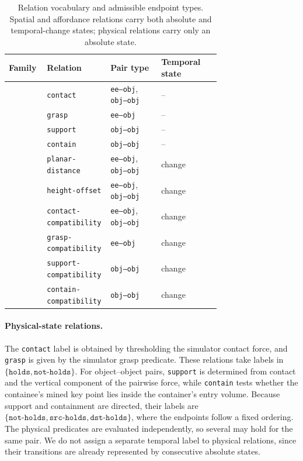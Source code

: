 \begin{table}[h]
\centering
\footnotesize
\setlength{\tabcolsep}{4pt}
\renewcommand{\arraystretch}{1.08}
\caption{Relation vocabulary and admissible endpoint types. Spatial and
affordance relations carry both absolute and temporal-change states; physical
relations carry only an absolute state.}
\label{tab:main_relation_vocab}
\begin{tabularx}{0.99\linewidth}{@{}
>{\raggedright\arraybackslash}p{0.18\linewidth}
>{\raggedright\arraybackslash}p{0.30\linewidth}
>{\raggedright\arraybackslash}p{0.24\linewidth}
>{\raggedright\arraybackslash}X@{}}
\toprule
\textbf{Family} & \textbf{Relation} & \textbf{Pair type} & \textbf{Temporal state} \\
\midrule
\multirow{4}{*}{\textbf{Physical}}
& \texttt{contact} & \texttt{ee--obj}, \texttt{obj--obj} & -- \\
& \texttt{grasp} & \texttt{ee--obj} & -- \\
& \texttt{support} & \texttt{obj--obj} & -- \\
& \texttt{contain} & \texttt{obj--obj} & -- \\
\midrule
\multirow{2}{*}{\textbf{Spatial}}
& \texttt{planar-distance} & \texttt{ee--obj}, \texttt{obj--obj} & change \\
& \texttt{height-offset} & \texttt{ee--obj}, \texttt{obj--obj} & change \\
\midrule
\multirow{4}{*}{\textbf{Affordance}}
& \texttt{contact-compatibility} & \texttt{ee--obj}, \texttt{obj--obj} & change \\
& \texttt{grasp-compatibility} & \texttt{ee--obj} & change \\
& \texttt{support-compatibility} & \texttt{obj--obj} & change \\
& \texttt{contain-compatibility} & \texttt{obj--obj} & change \\
\bottomrule
\end{tabularx}
\end{table}

\paragraph{Physical-state relations.}
The \texttt{contact} label is obtained by thresholding the simulator contact
force, and \texttt{grasp} is given by the simulator grasp predicate. These
relations take labels in \(\{\texttt{holds},\texttt{not-holds}\}\). For
object--object pairs, \texttt{support} is determined from contact and the
vertical component of the pairwise force, while \texttt{contain} tests whether
the containee's mined key point lies inside the container's entry volume.
Because support and containment are directed, their labels are
\(\{\texttt{not-holds},\texttt{src-holds},\texttt{dst-holds}\}\), where the
endpoints follow a fixed ordering. The physical predicates are evaluated
independently, so several may hold for the same pair. We do not assign a
separate temporal label to physical relations, since their transitions are
already represented by consecutive absolute states.

